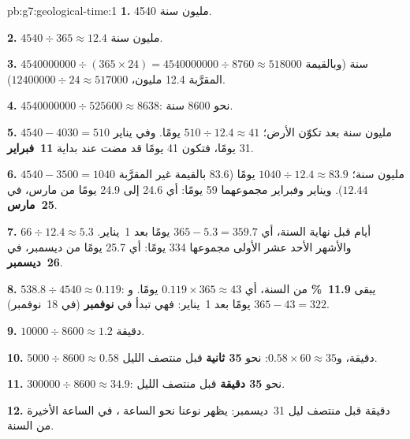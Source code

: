 \begin{solution}{pb:g7:geological-time:1}
\textbf{1.} \num{4540} مليون سنة.

\textbf{2.} $4540 \div 365 \approx 12.4$ مليون سنة.

\textbf{3.} $\num{4540000000} \div (365 \times 24) = \num{4540000000}
\div 8760 \approx \num{518000}$ سنة (وبالقيمة المقرَّبة \num{12.4}
مليون، $\num{12400000} \div 24 \approx \num{517000}$).

\textbf{4.} $\num{4540000000} \div \num{525600} \approx 8638$: نحو
\num{8600} سنة.

\textbf{5.} $4540 - 4030 = 510$ مليون سنة بعد تكوّن الأرض؛
$510 \div 12.4 \approx 41$ يومًا. وفي يناير 31 يومًا، فتكون 41 يومًا
قد مضت عند بداية \textbf{11~فبراير}.

\textbf{6.} $4540 - 3500 = 1040$ مليون سنة؛ $1040 \div 12.4 \approx
83.9$ يومًا (83.6 بالقيمة غير المقرَّبة $12.44$). ويناير وفبراير مجموعهما
59 يومًا: أي 24.6 إلى 24.9 يومًا من مارس، في \textbf{25~مارس}.

\textbf{7.} $66 \div 12.4 \approx 5.3$ أيام قبل نهاية السنة،
أي $365 - 5.3 = 359.7$ يومًا بعد 1~يناير. والأشهر الأحد عشر الأولى
مجموعها 334 يومًا: أي 25.7 يومًا من ديسمبر، في \textbf{26~ديسمبر}.

\textbf{8.} $538.8 \div 4540 \approx 0.119$: يبقى \textbf{11.9~\%} من
السنة، أي $0.119 \times 365 \approx 43$ يومًا. و$365 - 43 =
322$ يومًا بعد 1~يناير: فهي تبدأ في \textbf{نوفمبر} (في
18~نوفمبر).

\textbf{9.} $\num{10000} \div 8600 \approx 1.2$ دقيقة.

\textbf{10.} $5000 \div 8600 \approx 0.58$ دقيقة، و$0.58 \times 60
\approx 35$: نحو \textbf{35 ثانية} قبل منتصف الليل.

\textbf{11.} $\num{300000} \div 8600 \approx 34.9$: نحو \textbf{35
دقيقة} قبل منتصف الليل.

\textbf{12.}  دقيقة قبل منتصف ليل 31~ديسمبر: يظهر نوعنا نحو الساعة
\textbf{}، في الساعة الأخيرة من السنة.
\end{solution}
